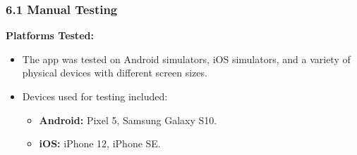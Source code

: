 \documentclass[12pt]{article}
\begin{document}
\subsubsection*{6.1 Manual Testing}

\textbf{Platforms Tested:}
\begin{itemize}
    \item The app was tested on Android simulators, iOS simulators, and a variety of physical devices with different screen sizes.
    \item Devices used for testing included:
    \begin{itemize}
        \item \textbf{Android:} Pixel 5, Samsung Galaxy S10.
        \item \textbf{iOS:} iPhone 12, iPhone SE.
    \end{itemize}
\end{itemize}
\end{document}
